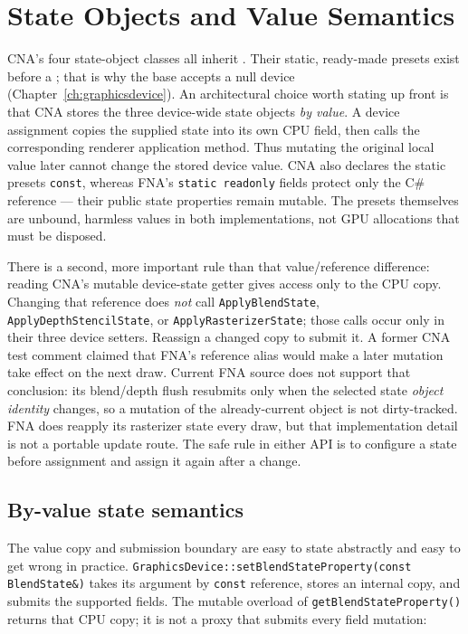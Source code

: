 \chapter{State Objects and Value Semantics}
\label{ch:state-objects}

CNA's four state-object classes all inherit . Their static,
ready-made presets exist before a ; that is why the base accepts a null
device (Chapter~\ref{ch:graphicsdevice}). An architectural choice worth stating up front is that
CNA stores the three device-wide state objects \emph{by value}. A device assignment copies the
supplied state into its own CPU field, then calls the corresponding renderer application method.
Thus mutating the original local value later cannot change the stored device value. CNA also
declares the static presets \texttt{const}, whereas
FNA's \texttt{static readonly} fields protect only the C\# reference --- their public state
properties remain mutable. The presets themselves are unbound, harmless 
values in both implementations, not GPU allocations that must be disposed.

There is a second, more important rule than that value/reference difference: reading CNA's
mutable device-state getter gives access only to the CPU copy. Changing that reference does
\emph{not} call \texttt{ApplyBlendState}, \texttt{ApplyDepthStencilState}, or
\texttt{ApplyRasterizerState}; those calls occur only in their three device setters. Reassign a
changed copy to submit it. A former CNA test comment claimed that FNA's reference alias would make
a later  mutation take effect on the next draw. Current FNA source does not
support that conclusion: its blend/depth flush resubmits only when the selected state \emph{object
identity} changes, so a mutation of the already-current object is not dirty-tracked. FNA does
reapply its rasterizer state every draw, but that implementation detail is not a portable update
route. The safe rule in either API is to configure a state before assignment and assign it again
after a change.

\section{By-value state semantics}

The value copy and submission boundary are easy to state abstractly and easy to get wrong in
practice. \texttt{GraphicsDevice::setBlendStateProperty(const BlendState\&)} takes its argument
by \texttt{const} reference, stores an internal copy, and submits the supported fields. The
mutable overload of \texttt{getBlendStateProperty()} returns that CPU copy; it is not a proxy that
submits every field mutation:

